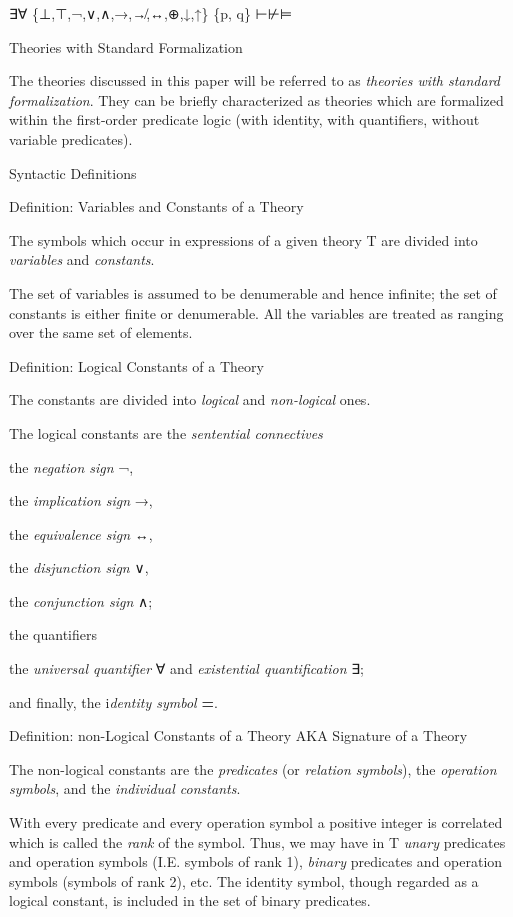 ∃∀ \{⊥,⊤,¬,∨,∧,→,↛,↔,⊕,↓,↑\} \{p, q\} ⊢⊬⊨

\protect\hypertarget{anchor}{}{}Theories with Standard Formalization

The theories discussed in this paper will be referred to as
\emph{theories with standard formalization}. They can be briefly
characterized as theories which are formalized within the first-order
predicate logic (with identity, with quantifiers, without variable
predicates).

\protect\hypertarget{anchor-1}{}{}Syntactic Definitions

\protect\hypertarget{anchor-2}{}{}Definition: Variables and Constants of
a Theory

The symbols which occur in expressions of a given theory T are divided
into \emph{variables} and \emph{constants}.

The set of variables is assumed to be denumerable and hence infinite;
the set of constants is either finite or denumerable. All the variables
are treated as ranging over the same set of elements.

\protect\hypertarget{anchor-3}{}{}Definition: Logical Constants of a
Theory

The constants are divided into \emph{logical} and \emph{non-logical}
ones.

The logical constants are the \emph{sentential connectives}

the \emph{negation sign} ¬,

the \emph{implication sign} →,

the \emph{equivalence sign} ↔,

the \emph{disjunction sign} ∨,

the \emph{conjunction sign }∧;

the quantifiers

the \emph{universal quantifier} ∀ and \emph{existential quantification}
∃;

and finally, the i\emph{dentity symbol} \textbf{=}.

\protect\hypertarget{anchor-4}{}{}

\protect\hypertarget{anchor-5}{}{}Definition: non-Logical Constants of a
Theory AKA Signature of a Theory

The non-logical constants are the \emph{predicates} (or \emph{relation
symbols}), the \emph{operation symbols}, and the \emph{individual
constants}.

With every predicate and every operation symbol a positive integer is
correlated which is called the \emph{rank} of the symbol. Thus, we may
have in T \emph{unary} predicates and operation symbols (I.E. symbols of
rank 1), \emph{binary} predicates and operation symbols (symbols of rank
2), etc. The identity symbol, though regarded as a logical constant, is
included in the set of binary predicates.

